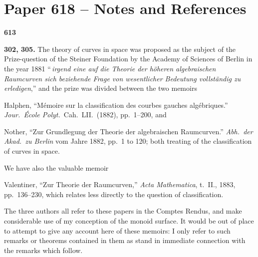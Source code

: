 \documentclass[12pt,a4paper]{article}
\theoremstyle{plain}
\begin{document}
\newpage
\section*{Paper 618 -- Notes and References}

\noindent\textbf{613}

\noindent\textbf{302, 305.} The theory of curves in space was proposed as the subject of the Prize-question of the Steiner Foundation by the Academy of Sciences of Berlin in the year 1881 ``\,\textit{irgend eine auf die Theorie der h\"{o}heren algebraischen Raumcurven sich beziehende Frage von wesentlicher Bedeutung vollst\"{a}ndig zu erledigen},'' and the prize was divided between the two memoirs

\vspace{0.2cm}
Halphen, ``M\'{e}moire sur la classification des courbes gauches alg\'{e}briques.'' \textit{Jour.~\'{E}cole Polyt.}~Cah.~LII.~(1882), pp.~1--200, and

\vspace{0.2cm}
\noindent Nother, ``Zur Grundlegung der Theorie der algebraischen Raumcurven.'' \textit{Abh.~der Akad.~zu Berlin} vom Jahre 1882, pp.~1 to 120; both treating of the classification of curves in space.

\vspace{0.3cm}
We have also the valuable memoir

\vspace{0.2cm}
Valentiner, ``Zur Theorie der Raumcurven,'' \textit{Acta Mathematica}, t.~II., 1883, pp.\ 136--230, which relates less directly to the question of classification.

\vspace{0.3cm}
The three authors all refer to these papers in the Comptes Rendus, and make considerable use of my conception of the monoid surface. It would be out of place to attempt to give any account here of these memoirs: I only refer to such remarks or theorems contained in them as stand in immediate connection with the remarks which follow.
\end{document}
